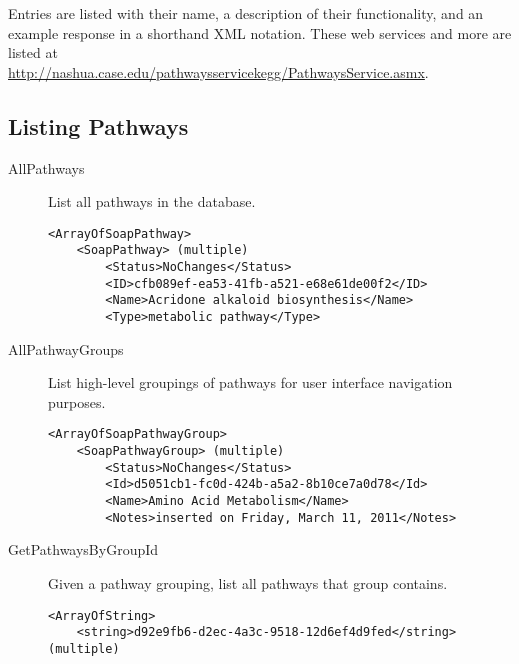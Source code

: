Entries are listed with their name, a description of their functionality, and
an example response in a shorthand XML notation. These web services and more
are listed at \\
\href{http://nashua.case.edu/pathwaysservicekegg/PathwaysService.asmx}{http://nashua.case.edu/pathwaysservicekegg/PathwaysService.asmx}.

\subsection{Listing Pathways}
\begin{description}

    \item[AllPathways] List all pathways in the \pathcasekegg database.

    \begin{lstlisting}
<ArrayOfSoapPathway>
    <SoapPathway> (multiple)
        <Status>NoChanges</Status>
        <ID>cfb089ef-ea53-41fb-a521-e68e61de00f2</ID>
        <Name>Acridone alkaloid biosynthesis</Name>
        <Type>metabolic pathway</Type>
    \end{lstlisting}

    \item[AllPathwayGroups] List high-level groupings of pathways for user
    interface navigation purposes.

    \begin{lstlisting}
<ArrayOfSoapPathwayGroup>
    <SoapPathwayGroup> (multiple)
        <Status>NoChanges</Status>
        <Id>d5051cb1-fc0d-424b-a5a2-8b10ce7a0d78</Id>
        <Name>Amino Acid Metabolism</Name>
        <Notes>inserted on Friday, March 11, 2011</Notes>
    \end{lstlisting}

    \item[GetPathwaysByGroupId] Given a pathway grouping, list all pathways
    that group contains.

    \begin{lstlisting}
<ArrayOfString>
    <string>d92e9fb6-d2ec-4a3c-9518-12d6ef4d9fed</string> (multiple)
    \end{lstlisting}

\end{description}

